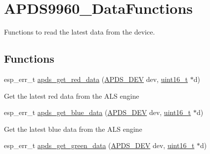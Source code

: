 \hypertarget{group__APDS9960__DataFunctions}{}\section{A\+P\+D\+S9960\+\_\+\+Data\+Functions}
\label{group__APDS9960__DataFunctions}


Functions to read the latest data from the device.  


\subsection*{Functions}
\begin{DoxyCompactItemize}
\item 
esp\+\_\+err\+\_\+t \hyperlink{group__APDS9960__DataFunctions_gac0d065ad91f2a8b597b428dd42476eb5}{apds\+\_\+get\+\_\+red\+\_\+data} (\hyperlink{structAPDS9960__Driver}{A\+P\+D\+S\+\_\+\+D\+EV} dev, \hyperlink{vl53l0x__types_8h_a273cf69d639a59973b6019625df33e30}{uint16\+\_\+t} $\ast$d)
\begin{DoxyCompactList}\small\item\em 
\begin{DoxyItemize}
\item Get the latest red data from the A\+LS engine 
\end{DoxyItemize}\end{DoxyCompactList}\item 
esp\+\_\+err\+\_\+t \hyperlink{group__APDS9960__DataFunctions_ga3d1a4e5592ac0a2e3cf82e66f58eb7db}{apds\+\_\+get\+\_\+blue\+\_\+data} (\hyperlink{structAPDS9960__Driver}{A\+P\+D\+S\+\_\+\+D\+EV} dev, \hyperlink{vl53l0x__types_8h_a273cf69d639a59973b6019625df33e30}{uint16\+\_\+t} $\ast$d)
\begin{DoxyCompactList}\small\item\em 
\begin{DoxyItemize}
\item Get the latest blue data from the A\+LS engine 
\end{DoxyItemize}\end{DoxyCompactList}\item 
esp\+\_\+err\+\_\+t \hyperlink{group__APDS9960__DataFunctions_ga9ec9895eceb5c721df9908fb9b129c70}{apds\+\_\+get\+\_\+green\+\_\+data} (\hyperlink{structAPDS9960__Driver}{A\+P\+D\+S\+\_\+\+D\+EV} dev, \hyperlink{vl53l0x__types_8h_a273cf69d639a59973b6019625df33e30}{uint16\+\_\+t} $\ast$d)
\begin{DoxyCompactList}\small\item\em 

\end{DoxyCompactList}
\end{DoxyCompactItemize}
